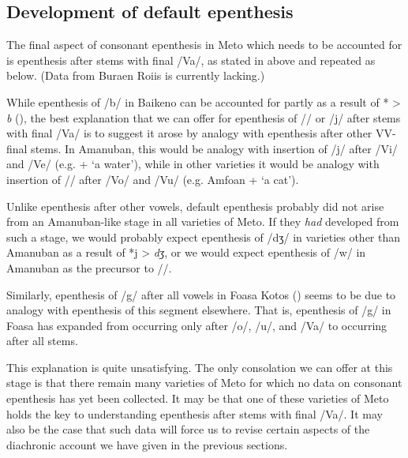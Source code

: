 \documentclass[output=paper]{langscibook}
\begin{document}
\subsection{Development of default epenthesis}\label{sec:DevDefIns}
The final aspect of consonant epenthesis in Meto which needs to be accounted for
is epenthesis after stems with final /Va/,
as stated in  above and repeated as  below.
(Data from Buraen Roi{\Q}is is currently lacking.)


While epenthesis of /b/ in Baikeno can be accounted
for partly as a result of *{\gw} > \textit{b} (),
the best explanation that we can offer for epenthesis of /\gw/
or /j/ after stems with final /Va/ is to suggest it arose
by analogy with epenthesis after other VV-final stems.
In Amanuban, this would be analogy with insertion of /j/ after /Vi/ and /Ve/
(e.g.  +  {\ra}  `a water'),
while in other varieties it would be analogy with insertion
of /\gw/ after /Vo/ and /Vu/
(e.g. Amfo{\Q}an  +  {\ra}  `a cat').

Unlike epenthesis after other vowels, default epenthesis
probably did not arise from an Amanuban-like stage in all varieties of Meto.
If they \emph{had} developed from such a stage,
we would probably expect epenthesis of /dʒ/ in varieties other than Amanuban
as a result of *j > \textit{dʒ}, or we would expect epenthesis
of /w/ in Amanuban as the precursor to /\gw/.

Similarly, epenthesis of /g/ after all vowels
in Fo{\Q}asa{\Q} Kotos ()
seems to be due to analogy with
epenthesis of this segment elsewhere.
That is, epenthesis of /g/ in Fo{\Q}asa{\Q}
has expanded from occurring only after /o/, /u/, and /Va/
to occurring after all stems.

This explanation is quite unsatisfying.
The only consolation we can offer at this
stage is that there remain many varieties of Meto
for which no data on consonant epenthesis has yet been collected.
It may be that one of these varieties of Meto holds the key
to understanding epenthesis after stems with final /Va/.
It may also be the case that such data will force
 us to revise
certain aspects of the diachronic account we
have given in the previous sections.
\end{document}
